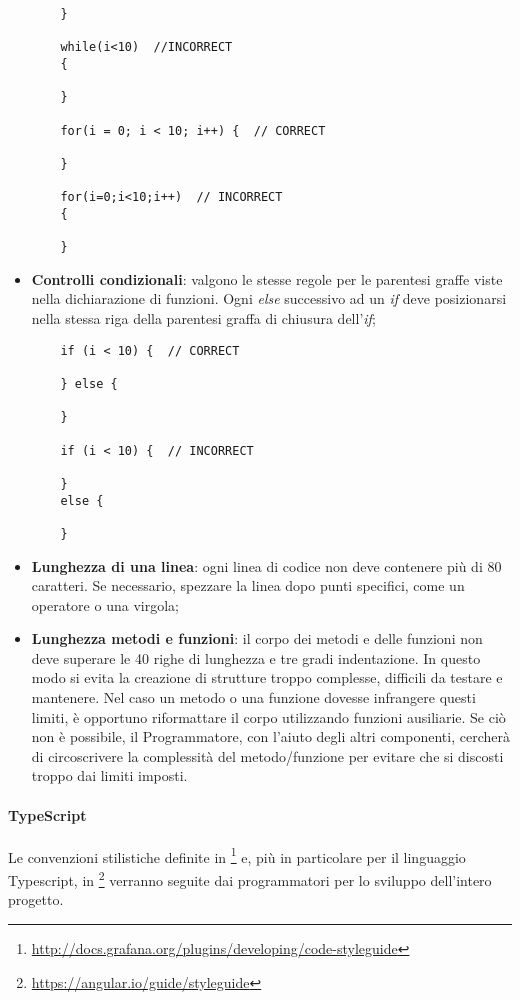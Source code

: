 \begin{itemize}
{\begin{lstlisting}
	}
	
	while(i<10)  //INCORRECT
	{  
	
	}
	
	for(i = 0; i < 10; i++) {  // CORRECT
		
	}
	
	for(i=0;i<10;i++)  // INCORRECT
	{  
	
	}
	\end{lstlisting}	
	}

	\item{\textbf{Controlli condizionali}: valgono le stesse regole per le parentesi graffe viste nella dichiarazione di funzioni. Ogni \emph{else} successivo ad un \emph{if} deve posizionarsi nella stessa riga della parentesi graffa di chiusura dell'\emph{if};}
	\begin{lstlisting}
	if (i < 10) {  // CORRECT
	
	} else {
	
	}
	
	if (i < 10) {  // INCORRECT  
	
	} 
	else {
	
	}
	\end{lstlisting}	
	
	\item{\textbf{Lunghezza di una linea}: ogni linea di codice non deve contenere più di 80 caratteri. Se necessario, spezzare la linea dopo punti specifici, come un operatore o una virgola;}
	
	\item{\textbf{Lunghezza metodi e funzioni}: il corpo dei metodi e delle funzioni non deve superare le 40 righe di lunghezza e tre gradi indentazione. In questo modo si evita la creazione di strutture troppo complesse, difficili da testare e mantenere. Nel caso un metodo o una funzione dovesse infrangere questi limiti, è opportuno riformattare il corpo utilizzando funzioni ausiliarie. Se ciò non è possibile, il Programmatore, con l'aiuto degli altri componenti, cercherà di circoscrivere la complessità del metodo/funzione per evitare che si discosti troppo dai limiti imposti.}
	
	
\end{itemize}


\paragraph{TypeScript}\Spazio
Le convenzioni stilistiche definite in \footnote{\url{http://docs.grafana.org/plugins/developing/code-styleguide}} e, più in particolare per il linguaggio Typescript, in \footnote{\url{https://angular.io/guide/styleguide}} verranno seguite dai programmatori per lo sviluppo dell'intero progetto.

